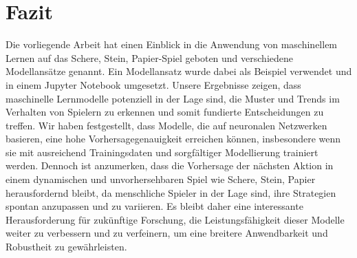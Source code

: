 \documentclass[thesis=paper,fancy]{hsmw-thesis}
\begin{document}
\chapter{Fazit}
Die vorliegende Arbeit hat einen Einblick in die Anwendung von maschinellem Lernen auf das Schere, Stein, Papier-Spiel geboten und verschiedene Modellansätze genannt. Ein Modellansatz wurde dabei als Beispiel verwendet und in einem Jupyter Notebook umgesetzt. Unsere Ergebnisse zeigen, dass maschinelle Lernmodelle potenziell in der Lage sind, die Muster und Trends im Verhalten von Spielern zu erkennen und somit fundierte Entscheidungen zu treffen. Wir haben festgestellt, dass Modelle, die auf neuronalen Netzwerken basieren, eine hohe Vorhersagegenauigkeit erreichen können, insbesondere wenn sie mit ausreichend Trainingsdaten und sorgfältiger Modellierung trainiert werden.
Dennoch ist anzumerken, dass die Vorhersage der nächsten Aktion in einem dynamischen und unvorhersehbaren Spiel wie Schere, Stein, Papier herausfordernd bleibt, da menschliche Spieler in der Lage sind, ihre Strategien spontan anzupassen und zu variieren. Es bleibt daher eine interessante Herausforderung für zukünftige Forschung, die Leistungsfähigkeit dieser Modelle weiter zu verbessern und zu verfeinern, um eine breitere Anwendbarkeit und Robustheit zu gewährleisten.



	
\end{document}
